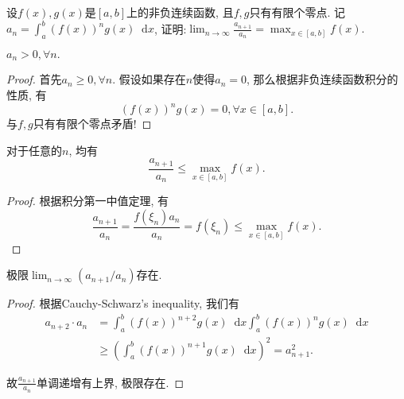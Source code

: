 \documentclass[a4paper,12pt]{ctexart}
\title{\TITLE}
\author{\AUTHOR}
\date{\today}
\newcommand{\diff}{\mathop{}\!\mathrm{d}}
\newcommand{\ratio}{\frac{a_{n+1}}{a_n}}
\newcommand{\maxf}{\max_{x\in[a,b]}{f(x)}}
\begin{document}
    \maketitle
    \thispagestyle{empty}
    \newpage

    \pagestyle{fancy}
    \linenumbers
    
    \begin{problem}
        设$f(x), g(x)$是$[a,b]$上的非负连续函数, 且$f,g$只有有限个零点.
        记$\displaystyle a_n=\int_a^b{(f(x))^ng(x)\diff x}$,
        证明:$\displaystyle \lim_{n\to\infty}\ratio=\maxf.$
    \end{problem}

    \begin{theorem}
        $a_n>0, \forall n.$
    \end{theorem}

    \begin{proof}
        首先$a_n\geq 0, \forall n$.
        假设如果存在$n$使得$a_n=0$, 那么根据非负连续函数积分的性质, 有
        \begin{equation}
            (f(x))^ng(x)=0, \forall x\in [a, b].
        \end{equation}
        与$f,g$只有有限个零点矛盾!
    \end{proof}

    \begin{theorem}
        \label{leq}
        对于任意的$n$, 均有
        \begin{equation}
            \ratio \leq \max_{x\in [a, b]}f(x).
        \end{equation}
    \end{theorem}

    \begin{proof}
        根据积分第一中值定理, 有
        \begin{equation}
            \ratio = \frac{f(\xi_n)a_n}{a_n} = f(\xi_n) \leq \maxf.
        \end{equation}
    \end{proof}

    \begin{theorem}
        \label{ext}
        极限$\lim_{n\to\infty}{(a_{n+1}/a_n)}$存在.
    \end{theorem}

    \begin{proof}
        根据Cauchy-Schwarz's inequality, 我们有
        \begin{equation}
        \begin{aligned}
            a_{n+2}\cdot a_{n}
            &= \int_a^b{(f(x))^{n+2}g(x)\diff x}\int_a^b{(f(x))^{n}g(x)\diff x}\\
            &\geq (\int_a^b{(f(x))^{n+1}g(x)\diff x})^2
            = a_{n+1}^2.
        \end{aligned}
        \end{equation}

        故$\displaystyle\ratio$单调递增有上界, 极限存在.
    \end{proof}
\end{document}
